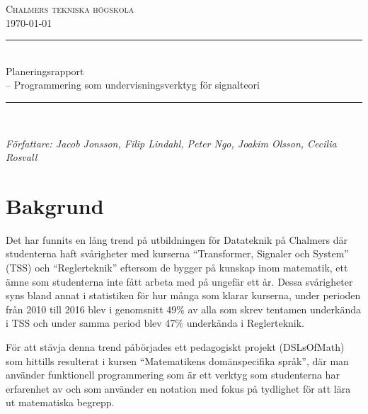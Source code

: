 \documentclass{article}
\begin{document}
\begin{titlepage} \newcommand{\HRule}{\rule{\linewidth}{0.3mm}}
\center
\textsc{\Large Chalmers tekniska högskola}\\[0.05cm] %
\normalsize \today

\HRule \\[0.08cm]
{ \large Planeringsrapport \\ \normalsize{-- Programmering som undervisningsverktyg för signalteori}}\\[0.08cm]
\HRule \\[0.3cm]

\begin{minipage}{0.5\textwidth}
\begin{flushleft} \small
\emph{Författare: Jacob Jonsson, Filip Lindahl, Peter Ngo, Joakim Olsson, Cecilia Rosvall}
\end{flushleft}

\end{minipage}


\end{titlepage}
\newpage
\tableofcontents
\newpage




\section{Bakgrund}
Det har funnits en lång trend på utbildningen för Datateknik på
Chalmers där studenterna haft svårigheter med kurserna “Transformer,
Signaler och System” (TSS) och “Reglerteknik”
eftersom de bygger på kunskap inom matematik, ett ämne som studenterna
inte fått arbeta med på ungefär ett år.
%
Dessa svårigheter syns bland annat i statistiken för hur många som
klarar kurserna, under perioden från 2010 till 2016 blev i genomsnitt
49\% av alla som skrev tentamen underkända i TSS och under samma
period blev 47\% underkända i Reglerteknik.

För att stävja denna trend påbörjades ett pedagogiskt projekt
(DSLsOfMath) som hittills resulterat i kursen “Matematikens
domänspecifika språk”, där man använder funktionell programmering som
är ett verktyg som studenterna har erfarenhet av och som använder en
notation med fokus på tydlighet för att lära ut matematiska begrepp.
\end{document}
